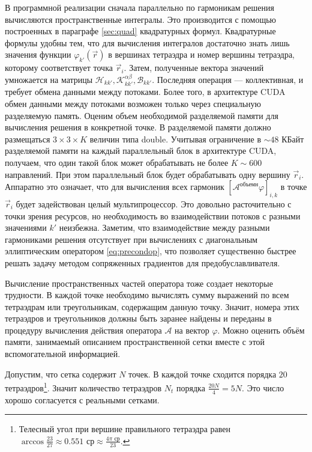 В программной реализации сначала параллельно по гармоникам решения вычисляются пространственные интегралы.
Это производится с помощью построенных в параграфе \ref{sec:quad} квадратурных формул. Квадратурные формулы удобны тем, что для вычисления интегралов достаточно знать лишь значения функции $\varphi_{k'}(\vec r)$ в вершинах тетраэдра и номер вершины тетраэдра, которому соответствует точка $\vec r_i$.
Затем, полученные вектора значений умножается на матрицы $\mathscr{H}_{kk'}, \mathscr{K}_{kk'}^{\alpha\beta}, \mathscr{B}_{kk'}$.
Последняя операция --- коллективная, и требует обмена данными между потоками. Более того, в архитектуре CUDA обмен данными 
между потоками возможен только через специальную разделяемую память. Оценим объем необходимой разделяемой памяти для 
вычисления решения в конкретной точке. В разделяемой памяти должно размещаться $3 \times 3 \times K$ величин типа 
\textsf{double}. Учитывая ограничение в $\sim 48$ КБайт разделяемой памяти на каждый параллельный блок в архитектуре CUDA,
получаем, что один такой блок может обрабатывать не более $K \sim 600$ направлений. При этом параллельный блок будет обрабатывать одну вершину $\vec r_i$. 
Аппаратно это означает, что для вычисления всех гармоник $[\mathcal{A}^\text{объемн} \varphi]_{i,k}$ в точке $\vec r_i$ будет задействован целый мультипроцессор.
Это довольно расточительно с точки зрения ресурсов, но необходимость во взаимодействии потоков с разными значениями $k'$ неизбежна.
Заметим, что взаимодействие между разными гармониками решения отсутствует при вычислениях с диагональным эллиптическим оператором \eqref{eq:precondop}, что позволяет существенно быстрее решать задачу методом сопряженных градиентов для предобуславливателя.

Вычисление пространственных частей оператора тоже создает некоторые трудности. В каждой точке необходимо вычислять сумму выражений
по всем тетраэдрам или треугольникам, содержащим данную точку. Значит, номера этих тетраэдров и треугольников должны быть заранее 
найдены и переданы в процедуру вычисления действия оператора $\mathcal A$ на вектор $\varphi$. Можно оценить объём памяти, занимаемый описанием пространственной 
сетки вместе с этой вспомогательной информацией.

Допустим, что сетка содержит $N$ точек. В каждой точке сходится порядка $20$ 
тетраэдров\footnote{Телесный угол при вершине правильного тетраэдра равен $\arccos \frac{23}{27} \approx 0.551\text{ ср} \approx \frac{4\pi\text{ ср}}{23}$. }.
Значит количество тетраэдров $N_t$ порядка $\frac{20N}{4} = 5N$. Это число хорошо согласуется с реальными сетками.

